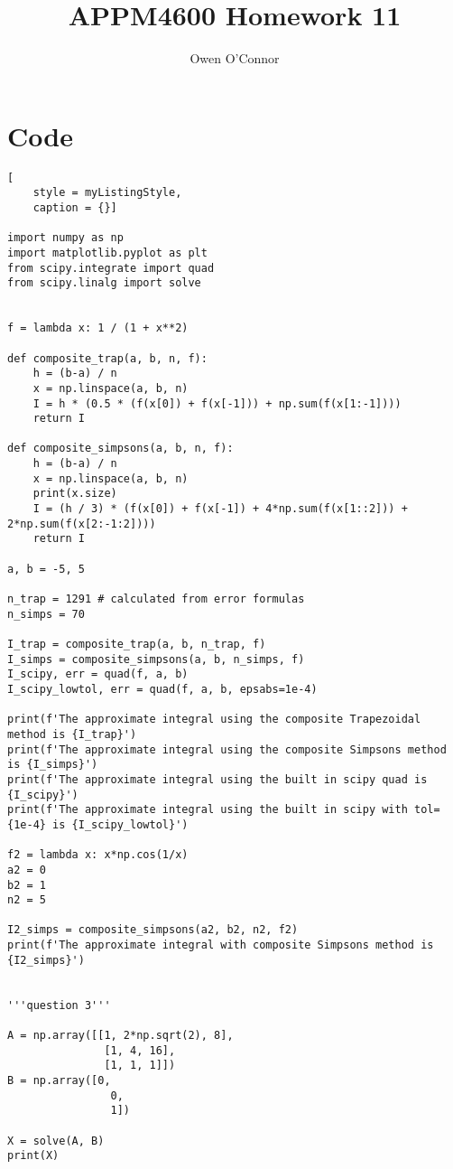 \documentclass[10pt,a4paper]{article}
\author{Owen O'Connor}
\title{APPM4600 Homework 11}
\begin{document}
\section{Code}


\begin{lstlisting}[
    style = myListingStyle,
    caption = {}]
    
import numpy as np
import matplotlib.pyplot as plt
from scipy.integrate import quad
from scipy.linalg import solve


f = lambda x: 1 / (1 + x**2)

def composite_trap(a, b, n, f):
    h = (b-a) / n
    x = np.linspace(a, b, n)
    I = h * (0.5 * (f(x[0]) + f(x[-1])) + np.sum(f(x[1:-1])))
    return I

def composite_simpsons(a, b, n, f):
    h = (b-a) / n
    x = np.linspace(a, b, n)
    print(x.size)
    I = (h / 3) * (f(x[0]) + f(x[-1]) + 4*np.sum(f(x[1::2])) + 2*np.sum(f(x[2:-1:2])))
    return I

a, b = -5, 5

n_trap = 1291 # calculated from error formulas
n_simps = 70

I_trap = composite_trap(a, b, n_trap, f)
I_simps = composite_simpsons(a, b, n_simps, f)
I_scipy, err = quad(f, a, b)
I_scipy_lowtol, err = quad(f, a, b, epsabs=1e-4)

print(f'The approximate integral using the composite Trapezoidal method is {I_trap}')
print(f'The approximate integral using the composite Simpsons method is {I_simps}')
print(f'The approximate integral using the built in scipy quad is {I_scipy}')
print(f'The approximate integral using the built in scipy with tol={1e-4} is {I_scipy_lowtol}')

f2 = lambda x: x*np.cos(1/x)
a2 = 0
b2 = 1
n2 = 5

I2_simps = composite_simpsons(a2, b2, n2, f2)
print(f'The approximate integral with composite Simpsons method is {I2_simps}')


'''question 3'''

A = np.array([[1, 2*np.sqrt(2), 8],
               [1, 4, 16],
               [1, 1, 1]])
B = np.array([0,
                0,
                1])

X = solve(A, B)
print(X)

\end{lstlisting}
\end{document}

